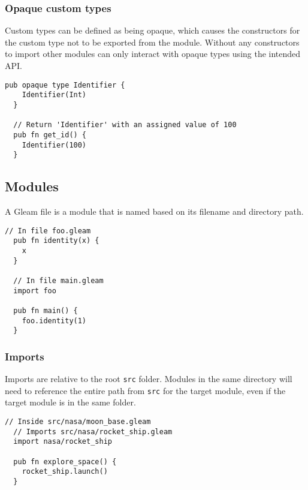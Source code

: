 \subsubsection*{\rmfamily Opaque custom types}

Custom types can be defined as being opaque, which causes the constructors for
the custom type not to be exported from the module. Without any constructors to
import other modules can only interact with opaque types using the intended API.

\begin{lstlisting}[belowskip=-\baselineskip]
  pub opaque type Identifier {
    Identifier(Int)
  }
  
  // Return 'Identifier' with an assigned value of 100
  pub fn get_id() {
    Identifier(100)
  }
\end{lstlisting}

\vs
\subsection*{\rmfamily Modules}

A Gleam file is a module that is named based on its filename and directory path.

\begin{lstlisting}[belowskip=-\baselineskip]
  // In file foo.gleam
  pub fn identity(x) {
    x
  }
  
  // In file main.gleam
  import foo

  pub fn main() {
    foo.identity(1)
  }
\end{lstlisting}

\vs
\subsubsection*{\rmfamily Imports}

Imports are relative to the root 
\lstinline[language=Gleam, basicstyle=\normalsize]!src! folder.
Modules in the same directory will need to reference the entire path
from \lstinline[language=Gleam, basicstyle=\normalsize]!src! for the target module,
even if the target module is in the same folder.

\begin{lstlisting}[belowskip=-\baselineskip]
  // Inside src/nasa/moon_base.gleam
  // Imports src/nasa/rocket_ship.gleam
  import nasa/rocket_ship
  
  pub fn explore_space() {
    rocket_ship.launch()
  }
\end{lstlisting}

